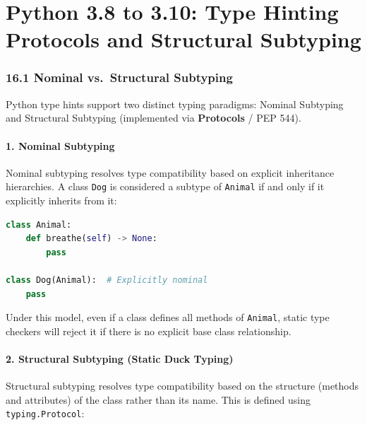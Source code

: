\hypertarget{python-3.8-to-3.10-type-hinting-protocols-and-structural-subtyping}{%
\chapter{Python 3.8 to 3.10: Type Hinting Protocols and Structural
Subtyping}\label{python-3.8-to-3.10-type-hinting-protocols-and-structural-subtyping}}

\hypertarget{nominal-vs.-structural-subtyping}{%
\subsection{16.1 Nominal vs.~Structural
Subtyping}\label{nominal-vs.-structural-subtyping}}

Python type hints support two distinct typing paradigms: Nominal
Subtyping and Structural Subtyping (implemented via \textbf{Protocols} /
PEP 544).

\hypertarget{nominal-subtyping}{%
\subsubsection{1. Nominal Subtyping}\label{nominal-subtyping}}

Nominal subtyping resolves type compatibility based on explicit
inheritance hierarchies. A class \passthrough{\lstinline!Dog!} is
considered a subtype of \passthrough{\lstinline!Animal!} if and only if
it explicitly inherits from it:

\begin{lstlisting}[language=Python]
class Animal:
    def breathe(self) -> None:
        pass

class Dog(Animal):  # Explicitly nominal
    pass
\end{lstlisting}

Under this model, even if a class defines all methods of
\passthrough{\lstinline!Animal!}, static type checkers will reject it if
there is no explicit base class relationship.

\hypertarget{structural-subtyping-static-duck-typing}{%
\subsubsection{2. Structural Subtyping (Static Duck
Typing)}\label{structural-subtyping-static-duck-typing}}

Structural subtyping resolves type compatibility based on the structure
(methods and attributes) of the class rather than its name. This is
defined using \passthrough{\lstinline!typing.Protocol!}:

